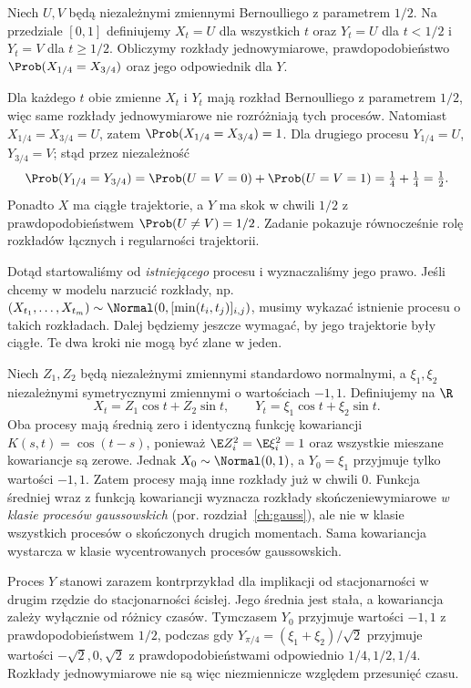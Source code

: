 \begin{zadanie}
Niech $U,V$ będą niezależnymi zmiennymi Bernoulliego z parametrem
$1/2$. Na przedziale $[0,1]$ definiujemy
$X_t=U$ dla wszystkich $t$ oraz
$Y_t=U$ dla $t<1/2$ i $Y_t=V$ dla $t\ge1/2$.
Obliczymy rozkłady jednowymiarowe, prawdopodobieństwo
$\Prob(X_{1/4}=X_{3/4})$ oraz jego odpowiednik dla $Y$.

Dla każdego $t$ obie zmienne $X_t$ i $Y_t$ mają rozkład
Bernoulliego z parametrem $1/2$, więc same rozkłady
jednowymiarowe nie rozróżniają tych procesów. Natomiast
$X_{1/4}=X_{3/4}=U$, zatem
$\Prob(X_{1/4}=X_{3/4})=1$.
Dla drugiego procesu
$Y_{1/4}=U$, $Y_{3/4}=V$; stąd przez niezależność
\[
\Prob(Y_{1/4}=Y_{3/4})
=\Prob(U=V=0)+\Prob(U=V=1)=\tfrac14+\tfrac14=\tfrac12.
\]
Ponadto $X$ ma ciągłe trajektorie, a $Y$ ma skok w chwili
$1/2$ z prawdopodobieństwem $\Prob(U\ne V)=1/2$.
Zadanie pokazuje równocześnie rolę rozkładów łącznych
i regularności trajektorii.
\end{zadanie}

\begin{uwaga}
Dotąd startowaliśmy od \emph{istniejącego} procesu i wyznaczaliśmy
jego prawo. Jeśli chcemy w modelu narzucić rozkłady, np.
$(X_{t_1},\ldots,X_{t_m})\sim\Normal(0,[\min(t_i,t_j)]_{i,j})$,
musimy wykazać istnienie procesu o takich rozkładach.
Dalej będziemy jeszcze wymagać, by jego trajektorie były ciągłe.
Te dwa kroki nie mogą być zlane w jeden.
\end{uwaga}


\begin{przyklad}
Niech $Z_1,Z_2$ będą niezależnymi zmiennymi standardowo
normalnymi, a $\xi_1,\xi_2$ niezależnymi symetrycznymi
zmiennymi o wartościach $-1,1$. Definiujemy na $\R$
\[
X_t=Z_1\cos t+Z_2\sin t,
\qquad Y_t=\xi_1\cos t+\xi_2\sin t.
\]
Oba procesy mają średnią zero i identyczną funkcję
kowariancji $K(s,t)=\cos(t-s)$, ponieważ
$\E Z_i^2=\E\xi_i^2=1$ oraz wszystkie mieszane
kowariancje są zerowe. Jednak $X_0\sim\Normal(0,1)$,
a $Y_0=\xi_1$ przyjmuje tylko wartości $-1,1$.
Zatem procesy mają inne rozkłady już w chwili $0$.
Funkcja średniej wraz z funkcją kowariancji wyznacza
rozkłady skończeniewymiarowe \emph{w klasie procesów gaussowskich}
(por. rozdział~\ref{ch:gauss}), ale nie w klasie
wszystkich procesów o skończonych drugich momentach.
Sama kowariancja wystarcza w klasie wycentrowanych
procesów gaussowskich.

Proces $Y$ stanowi zarazem kontrprzykład dla implikacji
od stacjonarności w drugim rzędzie do stacjonarności ścisłej.
Jego średnia jest stała, a kowariancja zależy wyłącznie
od różnicy czasów. Tymczasem $Y_0$ przyjmuje wartości
$-1,1$ z prawdopodobieństwem $1/2$, podczas gdy
$Y_{\pi/4}=(\xi_1+\xi_2)/\sqrt{2}$ przyjmuje wartości
$-\sqrt{2},0,\sqrt{2}$ z prawdopodobieństwami odpowiednio
$1/4,1/2,1/4$. Rozkłady jednowymiarowe nie są więc
niezmiennicze względem przesunięć czasu.
\end{przyklad}

